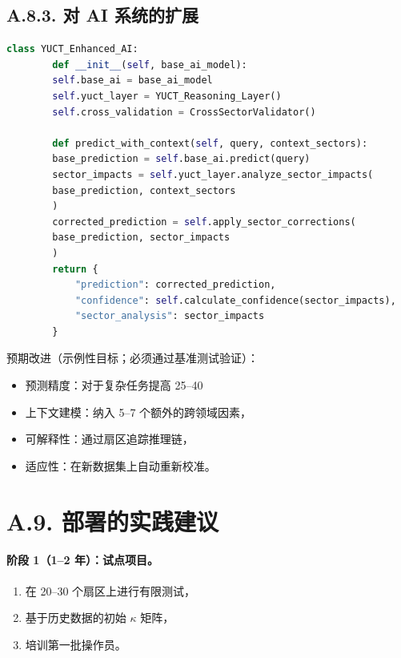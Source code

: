\documentclass[11pt,a4paper]{article}
\begin{document}
	\subsection*{A.8.3. 对 AI 系统的扩展}
	
	\begin{lstlisting}[language=Python]
		class YUCT_Enhanced_AI:
		def __init__(self, base_ai_model):
		self.base_ai = base_ai_model
		self.yuct_layer = YUCT_Reasoning_Layer()
		self.cross_validation = CrossSectorValidator()
		
		def predict_with_context(self, query, context_sectors):
		base_prediction = self.base_ai.predict(query)
		sector_impacts = self.yuct_layer.analyze_sector_impacts(
		base_prediction, context_sectors
		)
		corrected_prediction = self.apply_sector_corrections(
		base_prediction, sector_impacts
		)
		return {
			"prediction": corrected_prediction,
			"confidence": self.calculate_confidence(sector_impacts),
			"sector_analysis": sector_impacts
		}
	\end{lstlisting}
	
	预期改进（示例性目标；必须通过基准测试验证）：
	\begin{itemize}[leftmargin=*]
		\item 预测精度：对于复杂任务提高 25–40%
		\item 上下文建模：纳入 5–7 个额外的跨领域因素，
		\item 可解释性：通过扇区追踪推理链，
		\item 适应性：在新数据集上自动重新校准。
	\end{itemize}
	
	\section*{A.9. 部署的实践建议}
	
	\paragraph{阶段 1（1–2 年）：试点项目。}
	\begin{enumerate}[leftmargin=*]
		\item 在 20–30 个扇区上进行有限测试，
		\item 基于历史数据的初始 $\kappa$ 矩阵，
		\item 培训第一批操作员。
	\end{enumerate}
	
\end{document}
